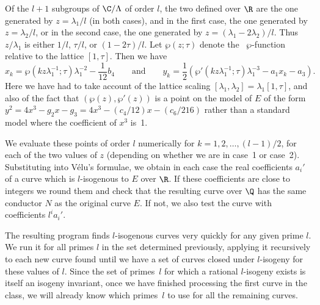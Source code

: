 Of the $l+1$ subgroups of $\C/\Lambda$ of order $l$, the two defined
over $\R$ are the one generated by $z=\lambda_1/l$ (in both cases),
and in the first case, the one generated by $z=\lambda_2/l$, or in the
second case, the one generated by $z=(\lambda_1-2\lambda_2)/l$.  Thus
$z/\lambda_1$ is either $1/l$, $\tau/l$, or $(1-2\tau)/l$.  Let
$\wp(z;\tau)$ denote the
\W\ $\wp$-function relative to the lattice $[1,\tau]$.  Then we have
$$
x_k = \wp(kz\lambda_1^{-1};\tau)\lambda_1^{-2} - \frac{1}{12}b_4 
\qquad\text{and}\qquad
y_k = \frac12\left(\wp'(kz\lambda_1^{-1};\tau)\lambda_1^{-3} - a_1x_k-a_3\right).
$$
Here we have had to take account of the lattice scaling 
$[\lambda_1,\lambda_2] = \lambda_1[1,\tau]$, and also of the fact that 
$(\wp(z),\wp'(z))$ is a point on the model of $E$ of the form 
$y^2=4x^3-g_2x-g_3 = 4x^3-(c_4/12)x-(c_6/216)$ rather than a standard 
model where the coefficient of $x^3$ is~1.

We evaluate these points of order $l$ numerically for
$k=1,2,\ldots,(l-1)/2$, for each of the two values of $z$ (depending
on whether we are in case~1 or case~2).  Substituting into V\'elu's
formulae, we obtain in each case the real coefficients $a_i'$ of a
curve which is $l$-isogenous to $E$ over $\R$.  If these coefficients
are close to integers we round them and check that the resulting curve
over $\Q$ has the same conductor $N$ as the original curve $E$.  If
not, we also test the curve with coefficients $l^ia_i'$.

The resulting program finds $l$-isogenous curves very quickly for any
given prime $l$.  We run it for all primes $l$ in the set determined
previously, applying it recursively to each new curve found until we
have a set of curves closed under $l$-isogeny for these values of $l$.
Since the set of primes~$l$ for which a rational $l$-isogeny exists is
itself an isogeny invariant, once we have finished processing the
first curve in the class, we will already know which primes~$l$ to use
for all the remaining curves.

